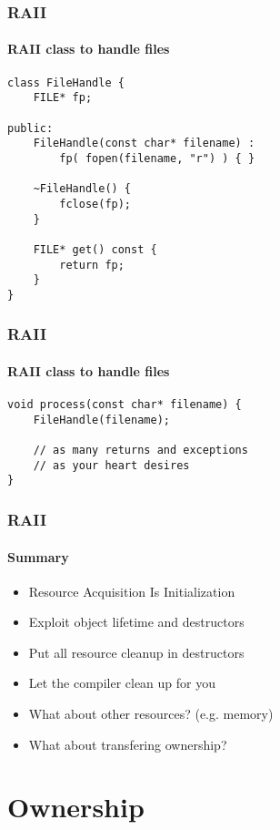 \begin{frame}[fragile]
    \frametitle{RAII}
    \framesubtitle{RAII class to handle files}
    \begin{lstlisting}[title=Problems begone!]
class FileHandle {
    FILE* fp;

public:
    FileHandle(const char* filename) :
        fp( fopen(filename, "r") ) { }

    ~FileHandle() {
        fclose(fp);
    }

    FILE* get() const {
        return fp;
    }
}
    \end{lstlisting}
\end{frame}

\begin{frame}[fragile]
    \frametitle{RAII}
    \framesubtitle{RAII class to handle files}
    \begin{lstlisting}[title=Problems begone!]
void process(const char* filename) {
    FileHandle(filename);

    // as many returns and exceptions
    // as your heart desires
}
    \end{lstlisting}
\end{frame}

\begin{frame}
    \frametitle{RAII}
    \framesubtitle{Summary}
    \begin{itemize}
        \item<1->Resource Acquisition Is Initialization 
        \item<1->Exploit object lifetime and destructors
        \item<1->Put all resource cleanup in destructors
        \item<1->Let the compiler clean up for you
        \item<2->What about other resources? (e.g. memory)
        \item<2->What about transfering ownership?
    \end{itemize}
\end{frame}


\section{Ownership}
\frame{\sectionpage}


